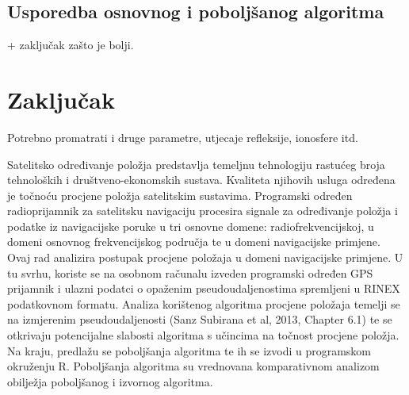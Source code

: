\documentclass[a4paper,twoside,12pt]{memoir} %
\begin{document}
\section{Usporedba osnovnog i poboljšanog algoritma} + zaključak zašto je bolji.
\chapter{Zaključak}
Potrebno promatrati i druge parametre, utjecaje refleksije, ionosfere itd.






\pagestyle{empty} %


\begin{sazetak}
Satelitsko određivanje položja predstavlja temeljnu
tehnologiju rastućeg broja tehnoloških i društveno-ekonomskih sustava.
Kvaliteta njihovih
usluga određena je točnoću procjene položja
satelitskim sustavima.
Programski određen radioprijamnik za satelitsku navigaciju
procesira signale za određivanje položja i podatke
iz navigacijske poruke
u tri osnovne domene: radiofrekvencijskoj, u domeni osnovnog frekvencijskog
područja te u domeni navigacijske primjene.
Ovaj rad analizira postupak procjene položaja
u domeni navigacijske primjene. U tu svrhu, koriste se na osobnom računalu
izveden programski određen GPS prijamnik i ulazni podatci
o opaženim pseudoudaljenostima spremljeni
u RINEX podatkovnom formatu.
Analiza korištenog algoritma procjene položaja
temelji se na izmjerenim pseudoudaljenosti (Sanz Subirana et al, 2013, Chapter 6.1)
te se otkrivaju potencijalne slabosti algoritma
s učincima na točnost procjene položja. Na kraju, predlažu se poboljšanja
algoritma te ih se izvodi u programskom okruženju R. 
Poboljšanja algoritma su vrednovana komparativnom analizom obilježja
poboljšanog i izvornog algoritma.
\end{sazetak}
\end{document}
